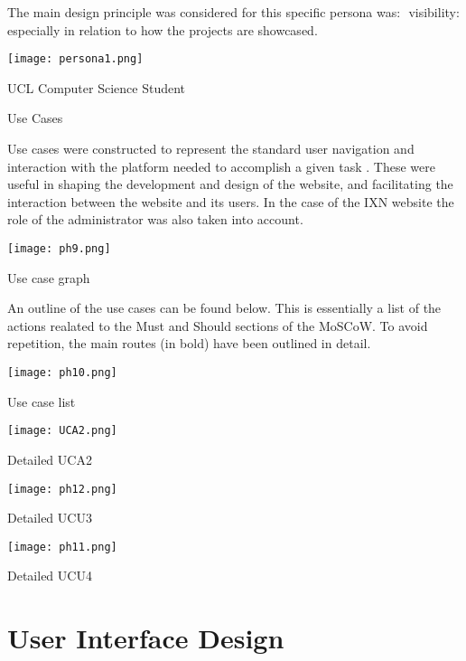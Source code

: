 \documentclass[fontsize=11pt]{extarticle}
\numberwithin{figure}{section} %
\begin{document}
The main design principle was considered for this specific persona was:
​ visibility: especially in relation to how the projects are showcased.
​

\begin{table}[H]
      \centering
      \texttt{[image: persona1.png]}
      \caption{UCL Computer Science Student}
\end{table}

Use Cases

Use cases were constructed to represent the standard user navigation and
interaction with the platform needed to accomplish a given task
\cite{g3}. These were useful in shaping the development and design of
the website, and facilitating the interaction between the website and
its users. In the case of the IXN website the role of the administrator
was also taken into account.

\begin{table}[H]
      \centering
      \texttt{[image: ph9.png]}
      \caption{Use case graph}
\end{table}

An outline of the use cases can be found below. This is essentially a
list of the actions realated to the Must and Should sections of the
MoSCoW. To avoid repetition, the main routes (in bold) have been
outlined in detail.

\begin{table}[H]
      \centering
      \texttt{[image: ph10.png]}
      \caption{Use case list}
 \end{table}

\begin{table}[H]
      \centering
      \texttt{[image: UCA2.png]}
      \caption{Detailed UCA2}
 \end{table}

\begin{table}[H]
      \centering
      \texttt{[image: ph12.png]}
      \caption{Detailed UCU3}
 \end{table}

\begin{table}[H]
      \centering
      \texttt{[image: ph11.png]}
      \caption{Detailed UCU4}
 \end{table}

\hypertarget{user-interface-design}{%
\section{User Interface Design}\label{user-interface-design}}
\end{document}
